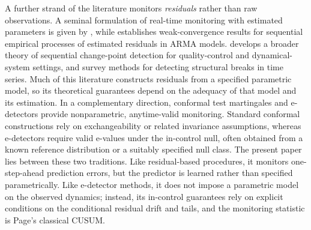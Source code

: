 \documentclass[bj,authoryear]{imsart}
\theoremstyle{plain}
\theoremstyle{definition}
\begin{document}
A further strand of the literature monitors \emph{residuals} rather than raw observations. A seminal formulation of real-time monitoring with estimated parameters is given by \citet{chu1996monitoring}, while \citet{bai1994residuals} establishes weak-convergence results for sequential empirical processes of estimated residuals in ARMA models. \citet{lai1995sequential} develops a broader theory of sequential change-point detection for quality-control and dynamical-system settings, and \citet{aue2013structural} survey methods for detecting structural breaks in time series. Much of this literature constructs residuals from a specified parametric model, so its theoretical guarantees depend on the adequacy of that model and its estimation.
%
In a complementary direction, conformal test martingales and e-detectors \citep{vovk2005algorithmic,shin2024edetectors} provide nonparametric, anytime-valid monitoring. Standard conformal constructions rely on exchangeability or related invariance assumptions, whereas e-detectors require valid e-values under the in-control null, often obtained from a known reference distribution or a suitably specified null class. The present paper lies between these two traditions. Like residual-based procedures, it monitors one-step-ahead prediction errors, but the predictor is learned rather than specified parametrically. Like e-detector methods, it does not impose a parametric model on the observed dynamics; instead, its in-control guarantees rely on explicit conditions on the conditional residual drift and tails, and the monitoring statistic is Page’s classical CUSUM.
\end{document}
